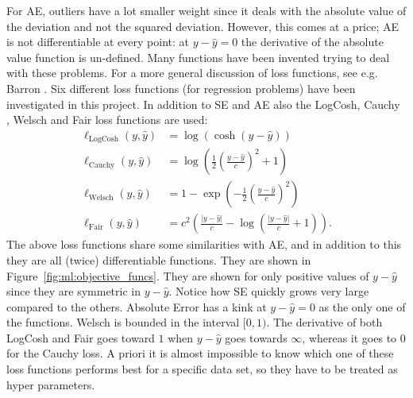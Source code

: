 \documentclass[a4paper, twoside, nobib]{tufte-book}
\newcommand{\abs}[1]{\lvert#1\rvert}
\begin{document}
For AE, outliers have a lot smaller weight since it deals with the absolute value of the deviation and not the squared deviation. However, this comes at a price; AE is not differentiable at every point: at $y-\hat{y} = 0$ the derivative of the absolute value function is un-defined. Many functions have been invented trying to deal with these problems. For a more general discussion of loss functions, see e.g. Barron \citep{barronGeneralAdaptiveRobust2017}. Six different loss functions (for regression problems) have been investigated in this project. In addition to SE and AE also the LogCosh, Cauchy  \citep{barronGeneralAdaptiveRobust2017}, Welsch  \citep{barronGeneralAdaptiveRobust2017} and Fair  \citep{AllstateClaimsSeverity} loss functions are used:
\begin{equation}
  \begin{split}
    \ell_\mathrm{LogCosh}(y, \hat{y})  &= \log\left( \cosh\left( y-\hat{y} \right) \right) \\
    \ell_\mathrm{Cauchy}(y, \hat{y})  &= \log\left( \frac{1}{2} \left(\frac{y-\hat{y}}{c}\right)^2 + 1   \right) \\
    \ell_\mathrm{Welsch}(y, \hat{y})  &=  1 - \exp\left( - \frac{1}{2} \left(\frac{y-\hat{y}}{c}\right)^2  \right)\\
    \ell_\mathrm{Fair}(y, \hat{y})  &= c^2  \left( \frac{\abs{y-\hat{y}} }{c}  - \log \left(\frac{\abs{y-\hat{y}}}{c} +1 \right )   \right). 
  \end{split}
\end{equation}
The above loss functions share some similarities with AE, and in addition to this they are all (twice) differentiable functions. They are shown in Figure~\ref{fig:ml:objective_funcs}. They are shown for only positive values of $y-\hat{y}$ since they are symmetric in $y-\hat{y}$. Notice how SE quickly grows very large compared to the others. Absolute Error has a kink at $y-\hat{y}=0$ as the only one of the functions. Welsch is bounded in the interval $[0, 1)$. The derivative of both LogCosh and Fair goes toward $1$ when $y-\hat{y}$ goes towards $\infty$, whereas it goes to 0 for the Cauchy loss. A priori it is almost impossible to know which one of these loss functions performs best for a specific data set, so they have to be treated as hyper parameters. 
\end{document}
